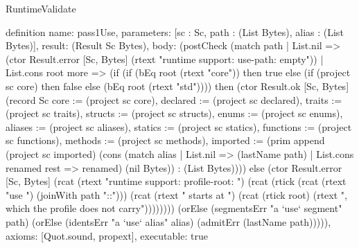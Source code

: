 \begin{lexlean}{RuntimeValidate}
\begin{semanticmodule}
definition{
  name: pass1Use,
  parameters: [sc : Sc, path : (List Bytes), alias : (List Bytes)],
  result: (Result Sc Bytes),
  body: (postCheck (match path
    | List.nil => (ctor Result.error [Sc, Bytes] (rtext "runtime support: use-path: empty"))
    | List.cons root more => (if (if (bEq root (rtext "core")) then true else (if (project sc core) then false else (bEq root (rtext "std")))) then (ctor Result.ok [Sc, Bytes] (record Sc {core := (project sc core), declared := (project sc declared), traits := (project sc traits), structs := (project sc structs), enums := (project sc enums), aliases := (project sc aliases), statics := (project sc statics), functions := (project sc functions), methods := (project sc methods), imported := (prim append (project sc imported) (cons (match alias
      | List.nil => (lastName path)
      | List.cons renamed rest => renamed) (nil Bytes)) : (List Bytes))})) else (ctor Result.error [Sc, Bytes] (rcat (rtext "runtime support: profile-root: ") (rcat (rtick (rcat (rtext "use ") (joinWith path "::"))) (rcat (rtext " starts at ") (rcat (rtick root) (rtext ", which the profile does not carry")))))))) (orElse (segmentsErr "a `use` segment" path) (orElse (identsErr "a `use` alias" alias) (admitErr (lastName path))))),
  axioms: [Quot.sound, propext],
  executable: true
}


\end{semanticmodule}
\end{lexlean}
